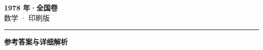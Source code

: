 \documentclass[zihao=5, a4paper]{ctexart}
\begin{document}
\begin{center}
  {\Large\bfseries 1978 年·全国卷}\\[4pt]
  {\large 数学 · 印刷版}
\end{center}
\medskip
{}

\par\bigskip\hrule\bigskip
{}
\begin{center}{\large\bfseries 参考答案与详细解析}\end{center}
\smallskip

\end{document}
